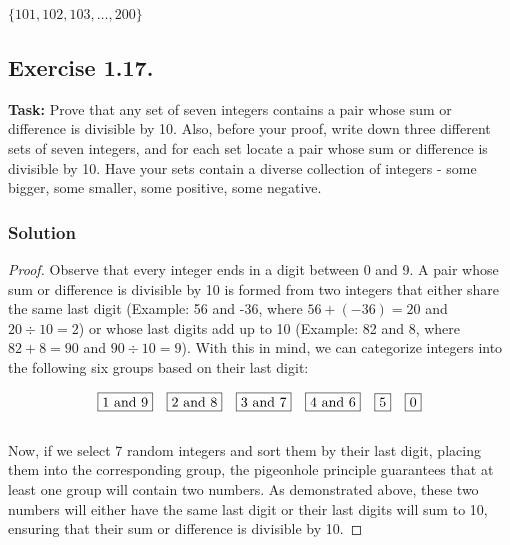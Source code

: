 \documentclass{article}
\begin{document}
$\{101, 102, 103, \ldots, 200\}$

\newpage

\subsection{Exercise 1.17.} 
\textbf{Task:} Prove that any set of seven integers contains a pair whose sum or difference is divisible by 10. Also, before your proof, write down three different sets of seven integers, and for each set locate a pair whose sum or difference is divisible by 10. Have your sets contain a diverse collection of integers - some bigger, some smaller, some positive, some negative.

\subsubsection*{Solution}

\begin{proof}
Observe that every integer ends in a digit between 0 and 9. A pair whose sum or difference is divisible by 10 is formed from two integers that either share the same last digit (Example: 56 and -36, where $56 + (-36) = 20$ and $20 \div 10 = 2$) or whose last digits add up to 10 (Example: 82 and 8, where $82 + 8 = 90$ and $90 \div 10 = 9$). With this in mind, we can categorize integers into the following six groups based on their last digit:

    \[
    \fbox{1 and 9} \quad \fbox{2 and 8} \quad \fbox{3 and 7} \quad \fbox{4 and 6} \quad \fbox{5} \quad \fbox{0}
    \]\\

Now, if we select 7 random integers and sort them by their last digit, placing them into the corresponding group, the pigeonhole principle guarantees that at least one group will contain two numbers. As demonstrated above, these two numbers will either have the same last digit or their last digits will sum to 10, ensuring that their sum or difference is divisible by 10.

\end{proof}

\newpage
\end{document}
